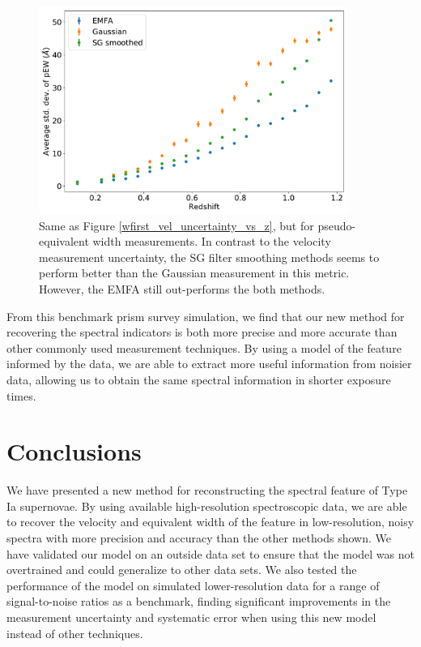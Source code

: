 \begin{figure}[htbp]
    \centering
    \includegraphics[width=0.9\textwidth]{figures/si_feat_pca/wfirst_pew_uncert.pdf}
    \caption{Same as Figure \ref{wfirst_vel_uncertainty_vs_z}, but for pseudo-equivalent width measurements. In contrast to the velocity measurement uncertainty, the SG filter smoothing methods seems to perform better than the Gaussian measurement in this metric. However, the EMFA still out-performs the both methods.}
    \label{wfirst_ew_uncertainty_vs_z}
\end{figure}

From this benchmark prism survey simulation, we find that our new method for recovering the \siliconii{} spectral indicators is both more precise and more accurate than other commonly used measurement techniques. By using a model of the feature informed by the data, we are able to extract more useful information from noisier data, allowing us to obtain the same spectral information in shorter exposure times. 

\section{Conclusions}
\label{conclusions}
We have presented a new method for reconstructing the \siliconii{} spectral feature of Type Ia supernovae. By using available high-resolution spectroscopic data, we are able to recover the velocity and equivalent width of the feature in low-resolution, noisy spectra with more precision and accuracy than the other methods shown. We have validated our model on an outside data set to ensure that the model was not overtrained and could generalize to other data sets. We also tested the performance of the model on simulated lower-resolution data for a range of signal-to-noise ratios as a benchmark, finding significant improvements in the measurement uncertainty and systematic error when using this new model instead of other techniques.

